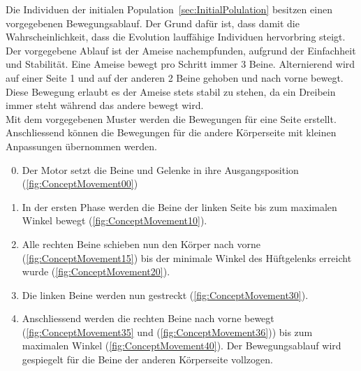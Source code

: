       Die Individuen der initialen Population~\vref{sec:InitialPolulation} besitzen einen vorgegebenen Bewegungsablauf.
      Der Grund dafür ist, dass damit die Wahrscheinlichkeit,
      dass die Evolution lauffähige Individuen hervorbring steigt.
      \\
      Der vorgegebene Ablauf ist der Ameise nachempfunden, aufgrund der Einfachheit und Stabilität.
      Eine Ameise bewegt pro Schritt immer 3 Beine.
      Alternierend wird auf einer Seite 1 und auf der anderen 2 Beine gehoben und nach vorne bewegt.
      Diese Bewegung erlaubt es der Ameise stets stabil zu stehen,
      da ein Dreibein immer steht während das andere bewegt wird.
      \\
      Mit dem vorgegebenen Muster werden die Bewegungen für eine Seite erstellt.
      Anschliessend können die Bewegungen für die andere Körperseite mit kleinen Anpassungen übernommen werden.

      \begin{enumerate}

        \setcounter{enumi}{-1}

        \item Der Motor setzt die Beine und Gelenke in ihre Ausgangsposition (\vref{fig:ConceptMovement00})

        \item In der ersten Phase werden die Beine der linken Seite bis zum maximalen Winkel bewegt
          (\vref{fig:ConceptMovement10}).

        \item Alle rechten Beine schieben nun den Körper nach vorne (\vref{fig:ConceptMovement15}) bis der minimale
          Winkel des Hüftgelenks erreicht wurde (\vref{fig:ConceptMovement20}).

        \item Die linken Beine werden nun gestreckt (\vref{fig:ConceptMovement30}).

        \item Anschliessend werden die rechten Beine nach vorne bewegt
          (\vref{fig:ConceptMovement35} und (\vref{fig:ConceptMovement36}))
          bis zum maximalen Winkel (\vref{fig:ConceptMovement40}).
          Der Bewegungsablauf wird gespiegelt für die Beine der anderen Körperseite vollzogen.

      \end{enumerate}

